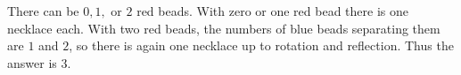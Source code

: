 There can be $0,1,$ or $2$ red beads. With zero or one red bead there is one necklace each. With two red beads, the numbers of blue beads separating them are $1$ and $2$, so there is again one necklace up to rotation and reflection. Thus the answer is $\boxed3$.
